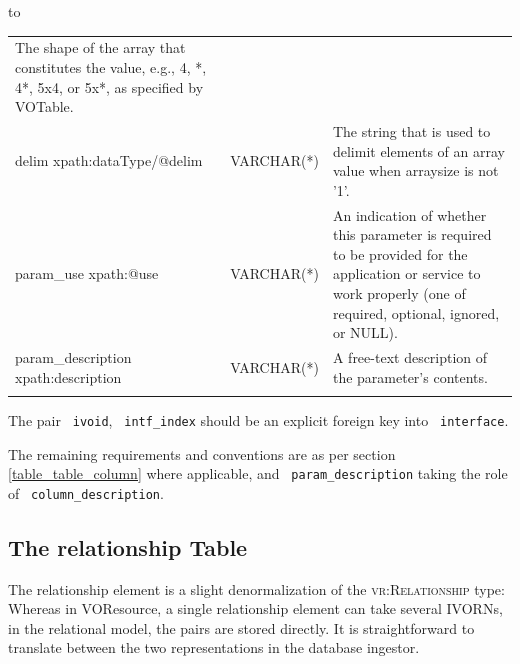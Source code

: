 \documentclass[11pt,a4paper]{ivoa}
\newcommand{\rtent}[1]{\texttt{\color{rtcolor} #1}}
\newcommand{\vorent}[1]{\textsc{#1}}
\newenvironment{inlinetable}{\vfil\penalty8000\vfilneg%
    \hbox to\hsize\bgroup\hss}
  {\hss\egroup\vspace{8pt}}
\begin{document}
\begin{inlinetable}
\begin{tabular}{p{}p{}p{}}
The shape of the array that constitutes the value, e.g., 4, *, 4*, 5x4, or 5x*, as specified by VOTable.\\
delim\hfil\break
\scriptsize\ttfamily xpath:dataType/@delim&
\footnotesize VARCHAR(*)&
The string that is used to delimit elements of an array value when arraysize is not '1'.\\
param\_use\hfil\break
\scriptsize\ttfamily xpath:@use&
\footnotesize VARCHAR(*)&
An indication of whether this parameter is required to be provided for the application or service to work properly (one of required, optional, ignored, or NULL).\\
param\_description\hfil\break
\scriptsize\ttfamily xpath:description&
\footnotesize VARCHAR(*)&
A free-text description of the parameter's contents.\\

\noalign{\vspace{2pt}}
\hline
\end{tabular}
\end{inlinetable}



 

The pair \rtent{ivoid}, \rtent{intf\_index} should be an explicit
foreign key into \rtent{interface}.

The remaining requirements and conventions are as per
section \ref{table_table_column}
where applicable, and \rtent{param\_description} taking the role
of \rtent{column\_description}.




\subsection{The relationship Table}

\label{table_relationship}

The relationship element is a slight denormalization of the
\vorent{vr:Relationship} type: Whereas in VOResource, a single
relationship element can take several IVORNs, in the relational model,
the pairs are stored directly.  It is straightforward to translate
between the two representations in the database ingestor.


\end{document}
